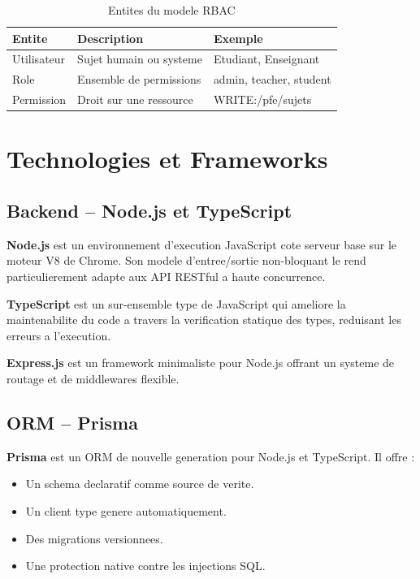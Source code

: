 \documentclass[12pt,a4paper]{report}
\begin{document}
\begin{table}[H]
\centering
\caption{Entites du modele RBAC}
\begin{tabular}{lll}
\toprule
\textbf{Entite} & \textbf{Description} & \textbf{Exemple} \\
\midrule
Utilisateur & Sujet humain ou systeme & Etudiant, Enseignant \\
Role        & Ensemble de permissions & admin, teacher, student \\
Permission  & Droit sur une ressource & WRITE:/pfe/sujets \\
\bottomrule
\end{tabular}
\end{table}

\section{Technologies et Frameworks}

\subsection{Backend -- Node.js et TypeScript}

\textbf{Node.js} est un environnement d'execution JavaScript cote serveur
base sur le moteur V8 de Chrome. Son modele d'entree/sortie non-bloquant
le rend particulierement adapte aux API RESTful a haute concurrence.

\textbf{TypeScript} est un sur-ensemble type de JavaScript qui ameliore
la maintenabilite du code a travers la verification statique des types,
reduisant les erreurs a l'execution.

\textbf{Express.js} est un framework minimaliste pour Node.js offrant un
systeme de routage et de middlewares flexible.

\subsection{ORM -- Prisma}

\textbf{Prisma} est un ORM de nouvelle generation pour Node.js et
TypeScript. Il offre :
\begin{itemize}
  \item Un schema declaratif comme source de verite.
  \item Un client type genere automatiquement.
  \item Des migrations versionnees.
  \item Une protection native contre les injections SQL.
\end{itemize}
\end{document}

